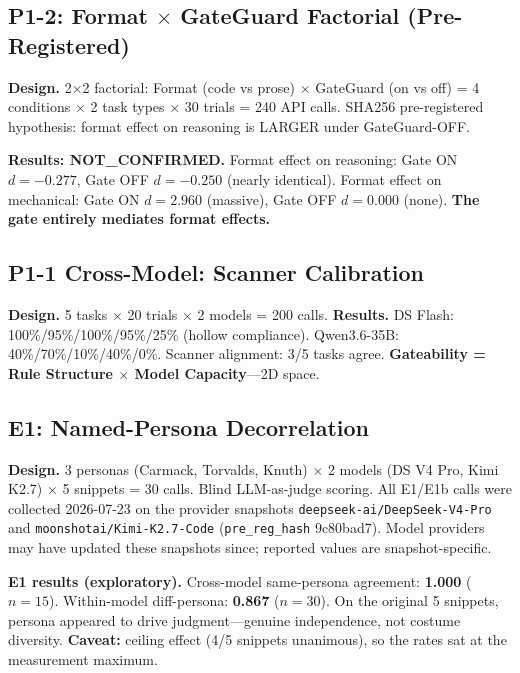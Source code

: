 \documentclass[11pt]{article}
\begin{document}
\subsection{P1-2: Format $\times$ GateGuard Factorial (Pre-Registered)}
\label{sec:p1-2}

\textbf{Design.} 2$\times$2 factorial: Format (code vs prose) $\times$ GateGuard
(on vs off) = 4 conditions $\times$ 2 task types $\times$ 30 trials = 240 API
calls. SHA256 pre-registered hypothesis: format effect on reasoning is LARGER
under GateGuard-OFF.

\textbf{Results: NOT\_CONFIRMED.} Format effect on reasoning: Gate ON
$d=-0.277$, Gate OFF $d=-0.250$ (nearly identical). Format effect on mechanical:
Gate ON $d=2.960$ (massive), Gate OFF $d=0.000$ (none). \textbf{The gate
entirely mediates format effects.}

\subsection{P1-1 Cross-Model: Scanner Calibration}
\label{sec:p1-1-cross}
\label{sec:scanner}

\textbf{Design.} 5 tasks $\times$ 20 trials $\times$ 2 models = 200 calls.
\textbf{Results.} DS Flash: 100\%/95\%/100\%/95\%/25\% (hollow compliance).
Qwen3.6-35B: 40\%/70\%/10\%/40\%/0\%. Scanner alignment: 3/5 tasks agree.
\textbf{Gateability = Rule Structure $\times$ Model Capacity}---2D space.

\subsection{E1: Named-Persona Decorrelation}
\label{sec:e1}

\textbf{Design.} 3 personas (Carmack, Torvalds, Knuth) $\times$ 2 models (DS V4
Pro, Kimi K2.7) $\times$ 5 snippets = 30 calls. Blind LLM-as-judge scoring.
All E1/E1b calls were collected 2026-07-23 on the provider snapshots
\texttt{deepseek-ai/DeepSeek-V4-Pro} and \texttt{moonshotai/Kimi-K2.7-Code}
(\texttt{pre\_reg\_hash} 9c80bad7). Model providers may have updated these
snapshots since; reported values are snapshot-specific.

\textbf{E1 results (exploratory).} Cross-model same-persona agreement:
\textbf{1.000} ($n=15$). Within-model diff-persona: \textbf{0.867} ($n=30$).
On the original 5 snippets, persona appeared to drive judgment---genuine
independence, not costume diversity. \textbf{Caveat:} ceiling effect (4/5
snippets unanimous), so the rates sat at the measurement maximum.
\end{document}
